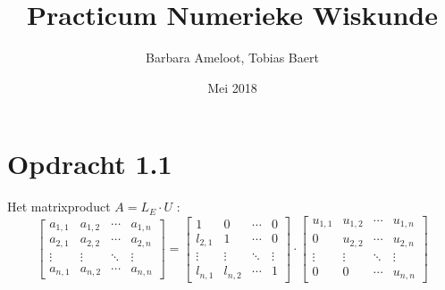 \documentclass[a4paper]{article}
\title{Practicum Numerieke Wiskunde}
\author{Barbara Ameloot, Tobias Baert}
\date{Mei 2018}
\begin{document}
\maketitle
   \section{Opdracht 1.1}
Het matrixproduct  $A=L_{E}\cdot U$ :
\\
\[
 \begin{bmatrix}
  a_{1,1} & a_{1,2} & \cdots & a_{1,n} \\
  a_{2,1} & a_{2,2} & \cdots & a_{2,n} \\
  \vdots  & \vdots  & \ddots & \vdots  \\
  a_{n,1} & a_{n,2} & \cdots & a_{n,n} 
 \end{bmatrix}
=
\begin{bmatrix}
 1 & 0 & \cdots & 0 \\
  l_{2,1} &1 & \cdots &0 \\
  \vdots  & \vdots  & \ddots & \vdots  \\
  l_{n,1} &l_{n,2} & \cdots & 1 
\end{bmatrix}
\cdot
\begin{bmatrix}
  u_{1,1} & u_{1,2} & \cdots & u_{1,n} \\
  0 & u_{2,2} & \cdots & u_{2,n} \\
  \vdots  & \vdots  & \ddots & \vdots  \\
 0 & 0 & \cdots & u_{n,n}
\end{bmatrix}
\]
\\
\end{document}
